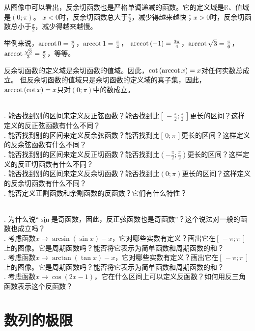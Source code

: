 \documentclass[12pt,UTF8]{ctexbook}
\begin{document}
从图像中可以看出，反余切函数也是严格单调递减的函数。它的定义域是$\mathbb{R}$、值域是$(0; \pi)$。
$x < 0$时，反余切函数总大于$\frac{\pi}{2}$，减少得越来越快；$x > 0$时，反余切函数总小于$\frac{\pi}{2}$，减少得越来越慢。

举例来说，$\operatorname{arccot}{0} = \frac{\pi}{2}$，$\operatorname{arccot}{1} = \frac{\pi}{4}$，
$\operatorname{arccot}{(-1)} = \frac{3\pi}{4}$，$\operatorname{arccot}{\sqrt{3}} = \frac{\pi}{6}$，$\operatorname{arccot}{\frac{\sqrt{3}}{3}} = \frac{\pi}{3}$，等等。

反余切函数的定义域是余切函数的值域。因此，$\cot{(\operatorname{arccot}{x})} = x$对任何实数总成立。
但反余切函数的值域只是余切函数的定义域的真子集，因此，$\operatorname{arccot}{(\cot{x})} = x$只对$(0; \pi)$中的数成立。

\begin{sk}
    \mbox{} \\
    . 能否找到别的区间来定义反正弦函数？能否找到比$[\,-\frac{\pi}{2};\frac{\pi}{2}\,]$更长的区间？这样定义的反正弦函数有什么不同？\\
    . 能否找到别的区间来定义反余弦函数？能否找到比$[\,0; \pi\,]$更长的区间？这样定义的反余弦函数有什么不同？\\
    . 能否找到别的区间来定义反正切函数？能否找到比$(-\frac{\pi}{2};\frac{\pi}{2})$更长的区间？这样定义的反正切函数有什么不同？\\
    . 能否找到别的区间来定义反余切函数？能否找到比$(0;\pi)$更长的区间？这样定义的反余切函数有什么不同？\\
    . 能否定义正割函数和余割函数的反函数？它们有什么特性？
\end{sk}
\begin{xt}
    \mbox{} \\
    . 为什么说“$\underline{\sin}$是奇函数，因此，反正弦函数也是奇函数”？这个说法对一般的函数也成立吗？\\
    . 考虑函数$x\mapsto \arcsin{(\sin{x})} - x$，它对哪些实数有定义？画出它在$[\,-\pi; \pi\,]$上的图像。它是周期函数吗？能否将它表示为简单函数和周期函数的和？\\
    . 考虑函数$x\mapsto \arctan{(\tan{x})} - x$，它对哪些实数有定义？画出它在$[\,-\pi; \pi\,]$上的图像。它是周期函数吗？能否将它表示为简单函数和周期函数的和？\\
    . 考虑函数$x\mapsto \cos(2x - 1)$，它在什么区间上可以定义反函数？如何用反三角函数表示这个反函数？
\end{xt}

\chapter{数列的极限}
\end{document}
